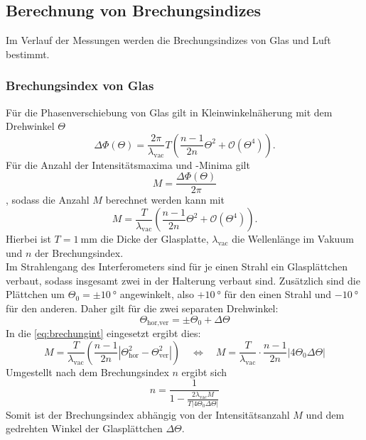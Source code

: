 \subsection{Berechnung von Brechungsindizes}
Im Verlauf der Messungen werden die Brechungsindizes von Glas und Luft bestimmt.
\subsubsection{Brechungsindex von Glas}
Für die Phasenverschiebung von Glas gilt in Kleinwinkelnäherung mit dem Drehwinkel $\Theta$
\begin{equation}
    \Delta\Phi\left(\Theta\right) = \frac{2\pi}{\lambda_{\text{vac}}}T\left(\frac{n - 1}{2n}\Theta^2 + \mathcal{O}\left(\Theta^4\right)\right).
    \label{eq:poli}
\end{equation}
Für die Anzahl der Intensitätsmaxima und -Minima gilt
\begin{equation}
    M = \frac{\Delta\Phi\left(\Theta\right)}{2\pi}
\end{equation}
, sodass die Anzahl $M$ berechnet werden kann mit
\begin{equation}
    M = \frac{T}{\lambda_{\text{vac}}}\left(\frac{n - 1}{2n}\Theta^2 + \mathcal{O}\left(\Theta^4\right)\right).
    \label{eq:brechungint}
\end{equation}
Hierbei ist $T = \SI{1}{\milli\metre}$ die Dicke der Glasplatte, $\lambda_{\text{vac}}$ die Wellenlänge im Vakuum und $n$ der Brechungsindex.\\
Im Strahlengang des Interferometers sind für je einen Strahl ein Glasplättchen verbaut, sodass insgesamt zwei in der Halterung verbaut sind.
Zusätzlich sind die Plättchen um $\Theta_0 = \pm \SI{10}{\degree}$ angewinkelt, also $+\SI{10}{\degree}$ für den einen Strahl und $-\SI{10}{\degree}$ für den anderen.
Daher gilt für die zwei separaten Drehwinkel:
\begin{equation}
    \Theta_{\text{hor,ver}} = \pm\Theta_0 + \Delta\Theta
\end{equation}
In die \autoref{eq:brechungint} eingesetzt ergibt dies:
\begin{equation}
    M = \frac{T}{\lambda_{\text{vac}}}\left(\frac{n - 1}{2n}|\Theta_{\text{hor}}^2 - \Theta_{\text{ver}}^2|\right) \quad \iff \quad M = \frac{T}{\lambda_{\text{vac}}}\cdot\frac{n - 1}{2n}|4\Theta_0 \Delta\Theta|
\end{equation}
Umgestellt nach dem Brechungsindex $n$ ergibt sich
\begin{equation}
    n = \frac{1}{1 - \frac{2\lambda_{\text{vac}}M}{T|4\Theta_0\Delta\Theta|}}
    \label{eq:brechungsindex}
\end{equation}
Somit ist der Brechungsindex abhängig von der Intensitätsanzahl $M$ und dem gedrehten Winkel der Glasplättchen $\Delta\Theta$.

